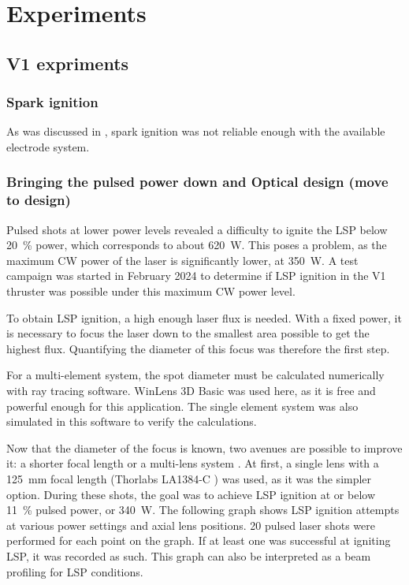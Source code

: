 \chapter{Experiments}

    \section{V1 expriments}

        \subsection{Spark ignition}
            
            As was discussed in \textcite{duplayArgonLaserPlasmaThruster2024a}, spark ignition was not reliable enough with the available electrode system. 

        \subsection{Bringing the pulsed power down and Optical design (move to design)} \label{sec:pulse_power_down_V1}
            
            Pulsed shots at lower power levels revealed a difficulty to ignite the LSP below \qty{20}{\%} power, which corresponds to about \qty{620}{W}. This poses a problem, as the maximum CW power of the laser is significantly lower, at \qty{350}{W}. A test campaign was started in February 2024 to determine if LSP ignition in the V1 thruster was possible under this maximum CW power level.
            
            To obtain LSP ignition, a high enough laser flux is needed. With a fixed power, it is necessary to focus the laser down to the smallest area possible to get the highest flux. Quantifying the diameter of this focus was therefore the first step. 


            For a multi-element system, the spot diameter must be calculated numerically with ray tracing software. WinLens 3D Basic \cite{winlens} was used here, as it is free and powerful enough for this application. The single element system was also simulated in this software to verify the calculations.

            Now that the diameter of the focus is known, two avenues are possible to improve it: a shorter focal length or a multi-lens system \cite{thorlabs}. At first, a single lens with a \qty{125}{mm} focal length (Thorlabs LA1384-C \cite{125mm lens}) was used, as it was the simpler option. During these shots, the goal was to achieve LSP ignition at or below \qty{11}{\%} pulsed power, or \qty{340}{W}. The following graph shows LSP ignition attempts at various power settings and axial lens positions. 20 pulsed laser shots were performed for each point on the graph. If at least one was successful at igniting LSP, it was recorded as such. This graph can also be interpreted as a beam profiling for LSP conditions.
            
